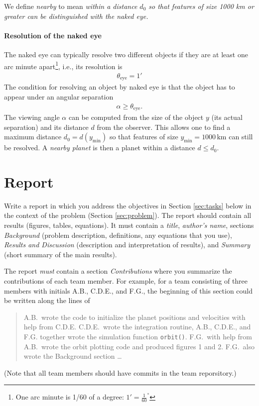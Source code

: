 \documentclass[letterpaper]{scrartcl}
\begin{document}
We define \emph{nearby} to mean \emph{within a distance $d_{0}$ so
  that features of size 1000 km or greater can be distinguished with
  the naked eye.}

\paragraph{Resolution of the naked eye}

The naked eye can typically resolve two different objects if they are
at least one arc minute apart\footnote{One arc minute is 1/60 of a
  degree: $1' = \frac{1}{60}^{\circ}$}, i.e., its resolution is
\begin{gather}
  \label{eq:thetaeye}
  \theta_{\text{eye}} = 1'
\end{gather}
The condition for resolving an object by naked eye is that the object
has to appear under an angular separation 
\begin{gather}
  \label{eq:resolution}
  \alpha \ge \theta_{\text{eye}}.
\end{gather}
The viewing angle $\alpha$ can be computed from the size of the object
$y$ (its actual separation) and its distance $d$ from the
observer. This allows one to find a maximum distance
$d_{0} = d(y_{\text{min}})$ so that features of size
$y_{\text{min}} = 1000\,\text{km}$ can still be resolved. A
\emph{nearby planet} is then a planet within a distance $d \le d_{0}$.


\section{Report}
\label{sec:report}

Write a report in which you address the objectives in Section
\ref{sec:tasks} below in the context of the problem (Section
\ref{sec:problem}). The report should contain all results (figures,
tables, equations). It must contain a \emph{title}, \emph{author's
  name}, sections \emph{Background} (problem description, definitions,
any equations that you use), \emph{Results and Discussion}
(description and interpretation of results), and \emph{Summary} (short
summary of the main results).

The report \emph{must} contain a section \emph{Contributions} where
you summarize the contributions of each team member. For example, for
a team consisting of three members with initials A.B., C.D.E., and
F.G., the beginning of this section could be written along the lines
of
\begin{quotation}
  A.B.\ wrote the code to initialize the planet positions and
  velocities with help from C.D.E. C.D.E.\ wrote the integration
  routine, A.B., C.D.E., and F.G. together wrote the simulation
  function \texttt{orbit()}. F.G.\ with help from A.B.\ wrote the
  orbit plotting code and produced figures 1 and 2. F.G.\ also wrote
  the Background section \dots
\end{quotation}
(Note that all team members should have commits in the team
reporsitory.)
\end{document}
